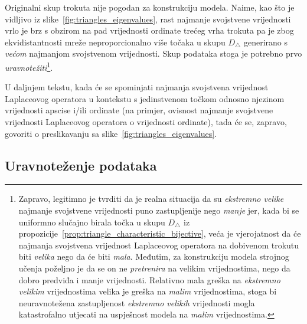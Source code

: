 \par%
\clearpage%
\newpage

Originalni skup trokuta nije pogodan za konstrukciju modela. Naime, kao što je vidljivo iz slike~\ref{fig:triangles_eigenvalues}, rast najmanje svojstvene vrijednosti vrlo je brz s obzirom na pad vrijednosti ordinate trećeg vrha trokuta pa je zbog ekvidistantnosti mreže neproporcionalno više točaka u skupu $ D_{{\bigtriangleup}} $ generirano s \emph{većom} najmanjom svojstvenom vrijednosti. Skup podataka stoga je potrebno prvo \emph{uravnotežiti}\footnote{Zapravo, legitimno je tvrditi da je realna situacija da su \emph{ekstremno velike} najmanje svojstvene vrijednosti puno zastupljenije nego \emph{manje} jer, kada bi se uniformno slučajno birala točka u skupu $ D_{{\bigtriangleup}} $ iz propozicije~\ref{prop:triangle_characteristic_bijective}, veća je vjerojatnost da će najmanja svojstvena vrijednost Laplaceovog operatora na dobivenom trokutu biti \emph{velika} nego da će biti \emph{mala}. Međutim, za konstrukciju modela strojnog učenja poželjno je da se on ne \emph{pretrenira} na velikim vrijednostima, nego da dobro predviđa i manje vrijednosti. Relativno mala greška na \emph{ekstremno velikim} vrijednostima velika je greška na \emph{malim} vrijednostima, stoga bi neuravnotežena zastupljenost \emph{ekstremno velikih} vrijednosti mogla katastrofalno utjecati na uspješnost modela na \emph{malim} vrijednostima.}.

\par

\begin{remark} \label{rem:point_Laplacian_eigenvalue}
    U daljnjem tekstu, kada će se spominjati najmanja svojstvena vrijednost Laplaceovog operatora u kontekstu s jedinstvenom točkom odnosno njezinom vrijednosti apscise i/ili ordinate (na primjer, ovisnost najmanje svojstvene vrijednosti Laplaceovog operatora o vrijednosti ordinate), tada će se, zapravo, govoriti o preslikavanju sa slike~\ref{fig:triangles_eigenvalues}.
\end{remark}

\par

\subsection{Uravnoteženje podataka}

\par

